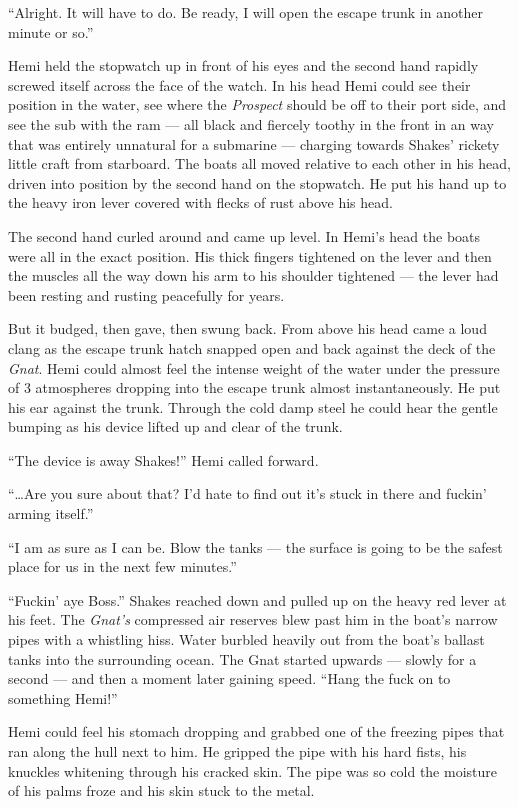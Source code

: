 \documentclass[]{scrbook}
\begin{document}
``Alright. It will have to do. Be ready, I will open the escape trunk in
another minute or so.''

Hemi held the stopwatch up in front of his eyes and the second hand
rapidly screwed itself across the face of the watch. In his head Hemi
could see their position in the water, see where the \emph{Prospect}
should be off to their port side, and see the sub with the ram --- all
black and fiercely toothy in the front in an way that was entirely
unnatural for a submarine --- charging towards Shakes' rickety little
craft from starboard. The boats all moved relative to each other in his
head, driven into position by the second hand on the stopwatch. He put
his hand up to the heavy iron lever covered with flecks of rust above
his head.

The second hand curled around and came up level. In Hemi's head the
boats were all in the exact position. His thick fingers tightened on the
lever and then the muscles all the way down his arm to his shoulder
tightened --- the lever had been resting and rusting peacefully for
years.

But it budged, then gave, then swung back. From above his head came a
loud clang as the escape trunk hatch snapped open and back against the
deck of the \emph{Gnat}. Hemi could almost feel the intense weight of
the water under the pressure of 3 atmospheres dropping into the escape
trunk almost instantaneously. He put his ear against the trunk. Through
the cold damp steel he could hear the gentle bumping as his device
lifted up and clear of the trunk.

``The device is away Shakes!'' Hemi called forward.

``\ldots{}Are you sure about that? I'd hate to find out it's stuck in
there and fuckin' arming itself.''

``I am as sure as I can be. Blow the tanks --- the surface is going to
be the safest place for us in the next few minutes.''

``Fuckin' aye Boss.'' Shakes reached down and pulled up on the heavy red
lever at his feet. The \emph{Gnat's} compressed air reserves blew past
him in the boat's narrow pipes with a whistling hiss. Water burbled
heavily out from the boat's ballast tanks into the surrounding ocean.
The Gnat started upwards --- slowly for a second --- and then a moment
later gaining speed. ``Hang the fuck on to something Hemi!''

Hemi could feel his stomach dropping and grabbed one of the freezing
pipes that ran along the hull next to him. He gripped the pipe with his
hard fists, his knuckles whitening through his cracked skin. The pipe
was so cold the moisture of his palms froze and his skin stuck to the
metal.
\end{document}

